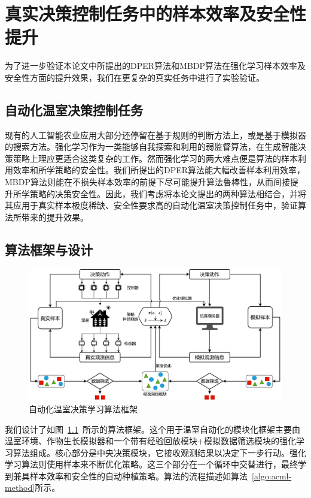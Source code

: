 
\chapter{真实决策控制任务中的样本效率及安全性提升}\label{chap:greenhouse}

为了进一步验证本论文中所提出的DPER算法和MBDP算法在强化学习样本效率及安全性方面的提升效果，我们在更复杂的真实任务中进行了实验验证。

\section{自动化温室决策控制任务}

现有的人工智能农业应用大部分还停留在基于规则的判断方法上，或是基于模拟器的搜索方法。强化学习作为一类能够自我探索和利用的弱监督算法，在生成智能决策策略上理应更适合这类复杂的工作。然而强化学习的两大难点便是算法的样本利用效率和所学策略的安全性。我们所提出的DPER算法能大幅改善样本利用效率，MBDP算法则能在不损失样本效率的前提下尽可能提升算法鲁棒性，从而间接提升所学策略的决策安全性。因此，我们考虑将本论文提出的两种算法相结合，并将其应用于真实样本极度稀缺、安全性要求高的自动化温室决策控制任务中，验证算法所带来的提升效果。

\section{算法框架与设计}

\begin{figure}[t]
\centering
\includegraphics[width=\textwidth]{figures/framework.pdf}
\caption{自动化温室决策学习算法框架}
\label{fig:framework}
\end{figure}

我们设计了如图~\ref{fig:framework}~所示的算法框架。这个用于温室自动化的模块化框架主要由温室环境、作物生长模拟器和一个带有经验回放模块+模拟数据筛选模块的强化学习算法组成。核心部分是中央决策模块，它接收观测结果以决定下一步行动。强化学习算法则使用样本来不断优化策略。这三个部分在一个循环中交替进行，最终学到兼具样本效率和安全性的自动种植策略。算法的流程描述如算法~\ref{algo:acml-method}所示。

